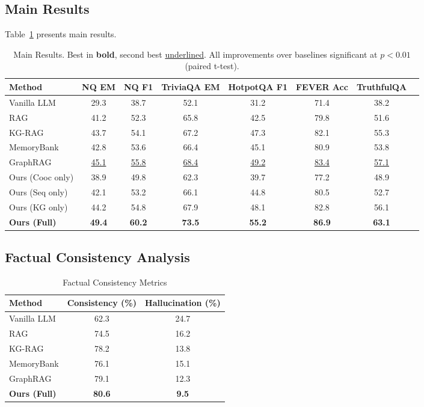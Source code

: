 \documentclass[conference]{IEEEtran}
\begin{document}
\subsection{Main Results}

Table~\ref{tab:main_results} presents main results.

\begin{table}[t]
\centering
\caption{Main Results. Best in \textbf{bold}, second best \underline{underlined}. All improvements over baselines significant at $p < 0.01$ (paired t-test).}
\label{tab:main_results}
\begin{tabular}{lccccccc}
\toprule
\textbf{Method} & \textbf{NQ EM} & \textbf{NQ F1} & \textbf{TriviaQA EM} & \textbf{HotpotQA F1} & \textbf{FEVER Acc} & \textbf{TruthfulQA} \\
\midrule
Vanilla LLM & 29.3 & 38.7 & 52.1 & 31.2 & 71.4 & 38.2 \\
RAG & 41.2 & 52.3 & 65.8 & 42.5 & 79.8 & 51.6 \\
KG-RAG & 43.7 & 54.1 & 67.2 & 47.3 & 82.1 & 55.3 \\
MemoryBank & 42.8 & 53.6 & 66.4 & 45.1 & 80.9 & 53.8 \\
GraphRAG & \underline{45.1} & \underline{55.8} & \underline{68.4} & \underline{49.2} & \underline{83.4} & \underline{57.1} \\
\midrule
Ours (Cooc only) & 38.9 & 49.8 & 62.3 & 39.7 & 77.2 & 48.9 \\
Ours (Seq only) & 42.1 & 53.2 & 66.1 & 44.8 & 80.5 & 52.7 \\
Ours (KG only) & 44.2 & 54.8 & 67.9 & 48.1 & 82.8 & 56.1 \\
\textbf{Ours (Full)} & \textbf{49.4} & \textbf{60.2} & \textbf{73.5} & \textbf{55.2} & \textbf{86.9} & \textbf{63.1} \\
\bottomrule
\end{tabular}
\end{table}

\subsection{Factual Consistency Analysis}

\begin{table}[h]
\centering
\caption{Factual Consistency Metrics}
\label{tab:factual}
\begin{tabular}{lcc}
\toprule
\textbf{Method} & \textbf{Consistency (\%)} & \textbf{Hallucination (\%)} \\
\midrule
Vanilla LLM & 62.3 & 24.7 \\
RAG & 74.5 & 16.2 \\
KG-RAG & 78.2 & 13.8 \\
MemoryBank & 76.1 & 15.1 \\
GraphRAG & 79.1 & 12.3 \\
\textbf{Ours (Full)} & \textbf{80.6} & \textbf{9.5} \\
\bottomrule
\end{tabular}
\end{table}
\end{document}
